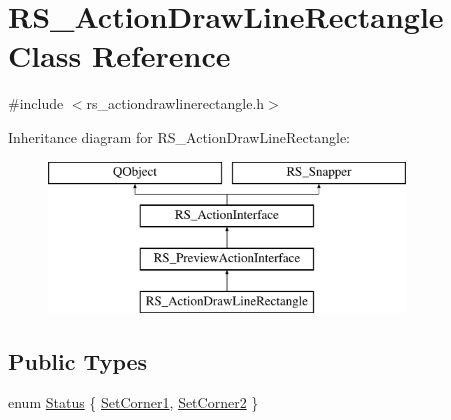 \hypertarget{classRS__ActionDrawLineRectangle}{\section{R\-S\-\_\-\-Action\-Draw\-Line\-Rectangle Class Reference}
\label{classRS__ActionDrawLineRectangle}
}


{\ttfamily \#include $<$rs\-\_\-actiondrawlinerectangle.\-h$>$}

Inheritance diagram for R\-S\-\_\-\-Action\-Draw\-Line\-Rectangle\-:\begin{figure}[H]
\begin{center}
\leavevmode
\includegraphics[height=4.000000cm]{classRS__ActionDrawLineRectangle}
\end{center}
\end{figure}
\subsection*{Public Types}
\begin{DoxyCompactItemize}
\item 
enum \hyperlink{classRS__ActionDrawLineRectangle_aa9707776b9826d5efa4bee7f590fce12}{Status} \{ \hyperlink{classRS__ActionDrawLineRectangle_aa9707776b9826d5efa4bee7f590fce12a9097e0d980478c893b0f901eb968d66d}{Set\-Corner1}, 
\hyperlink{classRS__ActionDrawLineRectangle_aa9707776b9826d5efa4bee7f590fce12afe2221c2337ba22d2d98b510cfe18731}{Set\-Corner2}
 \}
\end{DoxyCompactItemize}
